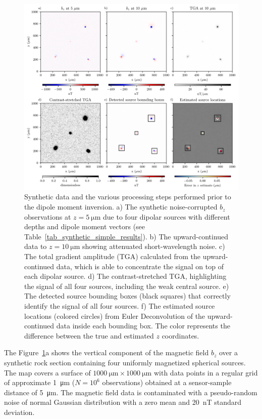 \begin{figure}[tb!]
  \centering
  \includegraphics[width=1\linewidth]{figures/simple-synthetic-data.png}
  \caption{
    Synthetic data and the various processing steps performed prior to the
    dipole moment inversion. 
    a) The synthetic noise-corrupted $b_z$ observations at 
    $z = \qty{5}{\micro\meter}$ due to four dipolar sources with different
    depths and dipole moment vectors 
    (see Table~\ref{tab_synthetic_simple_results}).
    b) The upward-continued data to $z = \qty{10}{\micro\meter}$ showing
    attenuated short-wavelength noise.
    c) The total gradient amplitude (TGA) calculated from the 
    upward-continued data, which is able to concentrate the signal on top
    of each dipolar source. 
    d) The contrast-stretched TGA, highlighting the signal of all four
    sources, including the weak central source.
    e) The detected source bounding boxes (black squares) that correctly
    identify the signal of all four sources.
    f) The estimated source locations (colored circles) from Euler 
    Deconvolution of the upward-continued data inside each bounding box. 
    The color represents the difference between the true and estimated 
    $z$ coordinates.
  }
  \label{fig_synthetic_simple_data}
\end{figure}

The Figure~\ref{fig_synthetic_simple_data}a shows the vertical component of the magnetic field $b_z$ over a synthetic rock section containing four uniformly magnetized spherical sources. The map covers a surface of $\qty{1000}{\um} \times \qty{1000}{\um}$ with data points in a regular grid of approximate \qty{1}{\um} ($N = 10^6$ observations) obtained at a sensor-sample distance of \qty{5}{\um}. The magnetic field data is contaminated with a pseudo-random noise of normal Gaussian distribution with a zero mean and \qty{20}{\nano\tesla} standard deviation.

